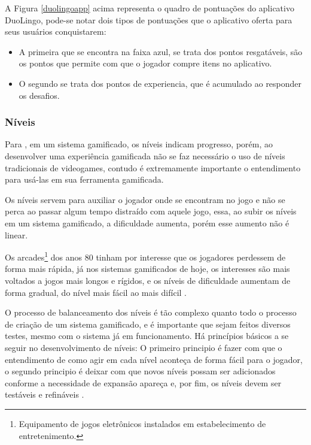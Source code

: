 		A Figura \ref{duolingoapp} acima representa o quadro de pontuações do aplicativo DuoLingo, pode-se notar dois tipos de pontuações que o aplicativo oferta para seus usuários conquistarem: 
		\begin{itemize}
			\item A primeira que se encontra na faixa azul, se trata dos pontos resgatáveis, são os pontos que permite com que o jogador compre itens no aplicativo.
			
			\item O segundo se trata dos pontos de experiencia, que é acumulado ao responder os desafios.
		\end{itemize}	
		
		\subsubsection{Níveis}
		Para , em um sistema gamificado, os níveis indicam progresso, porém, ao desenvolver uma experiência gamificada não se faz necessário o uso de níveis tradicionais de videogames, contudo é extremamente importante o entendimento para usá-las em sua ferramenta gamificada.
		
		Os níveis servem para auxiliar o jogador onde se encontram no jogo e não se perca ao passar algum tempo distraído com aquele jogo, essa, ao subir os níveis em um sistema gamificado, a dificuldade aumenta, porém esse aumento não é linear. \cite{zichermann2011gamification}
		
		Os arcades\footnote{Equipamento de jogos eletrônicos instalados em estabelecimento de entretenimento.} dos anos 80 tinham por interesse que os jogadores perdessem de forma mais rápida, já nos sistemas gamificados de hoje, os interesses são mais voltados a jogos mais longos e rígidos, e os níveis de dificuldade aumentam de forma gradual, do nível mais fácil ao mais difícil \cite{zichermann2011gamification}.
		
		O processo de balanceamento dos níveis é tão complexo quanto todo o processo de criação de um sistema gamificado, e é importante que sejam feitos diversos testes, mesmo com o sistema já em funcionamento. Há princípios básicos a se seguir no desenvolvimento de níveis: O primeiro principio é fazer com que o entendimento de como agir em cada nível aconteça de forma fácil para o jogador, o segundo principio é deixar com que novos níveis possam ser adicionados conforme a necessidade  de expansão apareça e, por fim, os níveis devem ser testáveis e refináveis \cite{zichermann2011gamification}.
		
